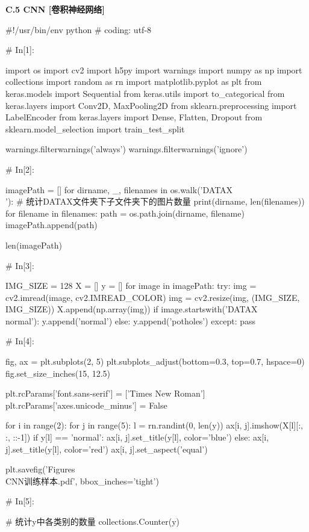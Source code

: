 \documentclass{MathorCupmodeling}
\begin{document}
\textbf{C.5 CNN [卷积神经网络]}
\begin{python}
#!/usr/bin/env python
# coding: utf-8

# In[1]:


import os
import cv2
import h5py
import warnings
import numpy as np
import collections
import random as rn
import matplotlib.pyplot as plt
from keras.models import Sequential
from keras.utils import to_categorical
from keras.layers import Conv2D, MaxPooling2D
from sklearn.preprocessing import LabelEncoder
from keras.layers import Dense, Flatten, Dropout
from sklearn.model_selection import train_test_split

warnings.filterwarnings('always')
warnings.filterwarnings('ignore')

# In[2]:


imagePath = []
for dirname, _, filenames in os.walk('DATAX\\'):
    # 统计DATAX文件夹下子文件夹下的图片数量
    print(dirname, len(filenames))
    for filename in filenames:
        path = os.path.join(dirname, filename)
        imagePath.append(path)

len(imagePath)

# In[3]:


IMG_SIZE = 128
X = []
y = []
for image in imagePath:
    try:
        img = cv2.imread(image, cv2.IMREAD_COLOR)
        img = cv2.resize(img, (IMG_SIZE, IMG_SIZE))
        X.append(np.array(img))
        if image.startswith('DATAX\\normal'):
            y.append('normal')
        else:
            y.append('potholes')
    except:
        pass

# In[4]:


fig, ax = plt.subplots(2, 5)
plt.subplots_adjust(bottom=0.3, top=0.7, hspace=0)
fig.set_size_inches(15, 12.5)

plt.rcParams['font.sans-serif'] = ['Times New Roman']
plt.rcParams['axes.unicode_minus'] = False

for i in range(2):
    for j in range(5):
        l = rn.randint(0, len(y))
        ax[i, j].imshow(X[l][:, :, ::-1])
        if y[l] == 'normal':
            ax[i, j].set_title(y[l], color='blue')
        else:
            ax[i, j].set_title(y[l], color='red')
        ax[i, j].set_aspect('equal')

plt.savefig('Figures\\CNN训练样本.pdf', bbox_inches='tight')

# In[5]:


# 统计y中各类别的数量
collections.Counter(y)


\end{python}
\end{document}
